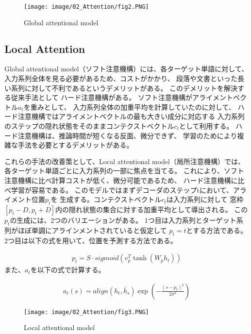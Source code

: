 \documentclass{jsarticle}
\begin{document}
\begin{figure}[H]
  \begin{center}
    \texttt{[image: image/02\_Attention/fig2.PNG]}
    \caption{Global attentional model}
    \label{fig:fig2}
  \end{center}
\end{figure}


\subsection{Local Attention}
Global attentional model（ソフト注意機構）には、各ターゲット単語に対して、
入力系列全体を見る必要があるため、コストがかかり、
段落や文書といった長い系列に対して不利であるというデメリットがある。
このデメリットを解決する従来手法として
ハード注意機構がある。
ソフト注意機構がアライメントベクトル$a_t$を重みとして、
入力系列全体の加重平均を計算していたのに対して、
ハード注意機構ではアライメントベクトルの最も大きい成分に対応する
入力系列のステップの隠れ状態をそのままコンテクストベクトル$c_t$として利用する。
ハード注意機構は、推論時間が短くなる反面、微分できず、
学習のためにより複雑な手法を必要とするデメリットがある。

これらの手法の改善策として、Local attentional model（局所注意機構）では、
各ターゲット単語ごとに入力系列の一部に焦点を当てる。
これにより、ソフト注意機構に比べ計算コストが低く、微分可能であるため、
ハード注意機構に比べ学習が容易である。
このモデルではまずデコーダのステップtにおいて、アライメント位置$p_t$を
生成する。コンテクストベクトル$c_t$は入力系列に対して
窓枠$[p_t-D,p_t+D]$内の隠れ状態の集合に対する加重平均として導出される。
この$p_t$の生成には、2つのバリエーションがある。
1つ目は入力系列とターゲット系列がほぼ単調にアラインメントされていると仮定して
$p_t=t$とする方法である。
2つ目は以下の式を用いて、位置を予測する方法である。

\begin{eqnarray}
  p_t = S\cdot sigmoid (v_p^T \tanh(W_p h_t))
\end{eqnarray}
また、$a_t$を以下の式で計算する。

\begin{eqnarray}
  a_t(s) = align(h_t,\bar h_s)\exp(-\frac{(s-p_t)^2}{2\sigma^2})
\end{eqnarray}


\begin{figure}[H]
  \begin{center}
    \texttt{[image: image/02\_Attention/fig3.PNG]}
    \caption{Local attentional model}
    \label{fig:fig3}
  \end{center}
\end{figure}
\end{document}
